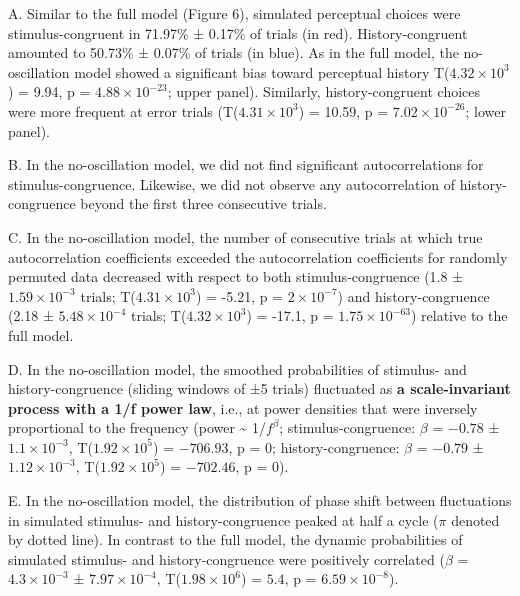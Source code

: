 \documentclass[
]{article}
\begin{document}
A. Similar to the full model (Figure 6), simulated perceptual choices
were stimulus-congruent in 71.97\% ± 0.17\% of trials (in red).
History-congruent amounted to 50.73\% ± 0.07\% of trials (in blue). As
in the full model, the no-oscillation model showed a significant bias
toward perceptual history T(\ensuremath{4.32\times 10^{3}}) = 9.94, p =
\(\ensuremath{4.88\times 10^{-23}}\); upper panel). Similarly,
history-congruent choices were more frequent at error trials
(T(\ensuremath{4.31\times 10^{3}}) = 10.59, p =
\(\ensuremath{7.02\times 10^{-26}}\); lower panel).

B. In the no-oscillation model, we did not find significant
autocorrelations for stimulus-congruence. Likewise, we did not observe
any autocorrelation of history-congruence beyond the first three
consecutive trials.

C. In the no-oscillation model, the number of consecutive trials at
which true autocorrelation coefficients exceeded the autocorrelation
coefficients for randomly permuted data decreased with respect to both
stimulus-congruence (1.8 ± \ensuremath{1.59\times 10^{-3}} trials;
T(\ensuremath{4.31\times 10^{3}}) = -5.21, p =
\(\ensuremath{2\times 10^{-7}}\)) and history-congruence (2.18 ±
\ensuremath{5.48\times 10^{-4}} trials;
T(\ensuremath{4.32\times 10^{3}}) = -17.1, p =
\(\ensuremath{1.75\times 10^{-63}}\)) relative to the full model.

D. In the no-oscillation model, the smoothed probabilities of stimulus-
and history-congruence (sliding windows of ±5 trials) fluctuated as
\textbf{a scale-invariant process with a 1/f power law}, i.e., at power
densities that were inversely proportional to the frequency (power
\textasciitilde{} 1/\(f^\beta\); stimulus-congruence: \(\beta\) =
\(-0.78\) ± \(\ensuremath{1.1\times 10^{-3}}\),
T(\(\ensuremath{1.92\times 10^{5}}\)) = \(-706.93\), p = \(0\);
history-congruence: \(\beta\) = \(-0.79\) ±
\(\ensuremath{1.12\times 10^{-3}}\),
T(\(\ensuremath{1.92\times 10^{5}}\)) = \(-702.46\), p = \(0\)).

E. In the no-oscillation model, the distribution of phase shift between
fluctuations in simulated stimulus- and history-congruence peaked at
half a cycle (\(\pi\) denoted by dotted line). In contrast to the full
model, the dynamic probabilities of simulated stimulus- and
history-congruence were positively correlated (\(\beta\) =
\(\ensuremath{4.3\times 10^{-3}}\) ±
\(\ensuremath{7.97\times 10^{-4}}\),
T(\(\ensuremath{1.98\times 10^{6}}\)) = \(5.4\), p =
\(\ensuremath{6.59\times 10^{-8}}\)).
\end{document}
